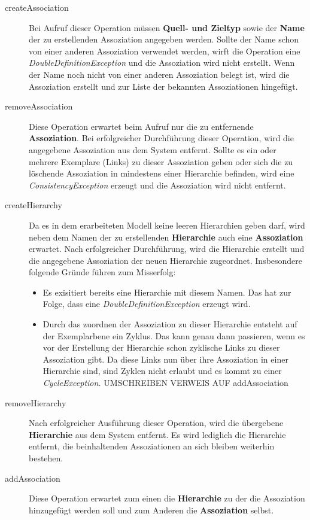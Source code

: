 \begin{description}
\item[createAssociation] Bei Aufruf dieser Operation müssen \textbf{Quell- und Zieltyp} sowie der \textbf{Name} der zu erstellenden Assoziation 
angegeben werden.
Sollte der Name schon von einer anderen Assoziation verwendet werden, wirft die Operation eine \emph{DoubleDefinitionException} und die Assoziation wird nicht
erstellt.
Wenn der Name noch nicht von einer anderen Assoziation belegt ist, wird die Assoziation erstellt und zur Liste der bekannten Assoziationen hingefügt. 
\item[removeAssociation] Diese Operation erwartet beim Aufruf nur die zu entfernende \textbf{Assoziation}. 
Bei erfolgreicher Durchführung dieser Operation, wird die
angegebene Assoziation aus dem System entfernt.
Sollte es ein oder mehrere Exemplare (Links) zu dieser Assoziation geben oder sich die zu löschende Assoziation in mindestens einer Hierarchie befinden, wird eine \emph{ConsistencyException} erzeugt und die Assoziation wird nicht entfernt. 
\item[createHierarchy] Da es in dem erarbeiteten Modell keine leeren Hierarchien geben darf, wird neben dem Namen der zu erstellenden \textbf{Hierarchie} auch eine 
\textbf{Assoziation} erwartet. Nach erfolgreicher Durchführung, wird die Hierarchie erstellt und die angegebene Assoziation der neuen Hierarchie zugeordnet.
Insbesondere folgende Gründe führen zum Misserfolg:
\begin{itemize}
\item Es exisitiert bereits eine Hierarchie mit diesem Namen. Das hat zur Folge, dass eine \emph{DoubleDefinitionException} erzeugt wird.
\item Durch das zuordnen der Assoziation zu dieser Hierarchie entsteht auf der Exemplarbene ein Zyklus. Das kann genau dann passieren, wenn es vor 
der Erstellung der Hierarchie schon zyklische Links zu dieser Assoziation gibt. Da diese Links nun über ihre Assoziation in einer Hierarchie sind, sind 
Zyklen nicht erlaubt und es kommt zu einer \emph{CycleException.} UMSCHREIBEN VERWEIS AUF addAssociation
\end{itemize}
\item[removeHierarchy] Nach erfolgreicher Ausführung dieser Operation, wird die übergebene \textbf{Hierarchie} aus dem System entfernt. 
Es wird lediglich die Hierarchie entfernt, die beinhaltenden Assoziationen an sich bleiben weiterhin bestehen.
\item[addAssociation] Diese Operation erwartet zum einen die \textbf{Hierarchie} zu der die Assoziation hinzugefügt werden soll und zum Anderen die \textbf{Assoziation} selbst.

\end{description}

